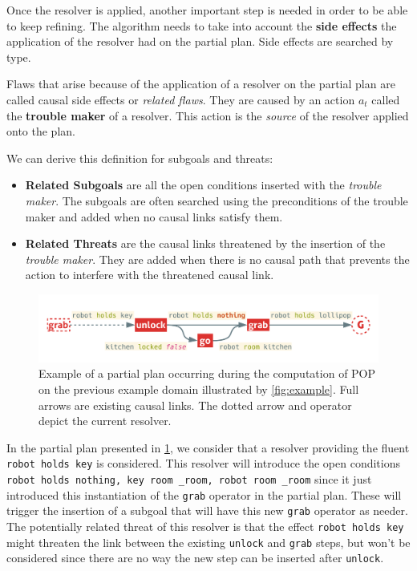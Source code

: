 Once the resolver is applied, another important step is needed in order
to be able to keep refining. The algorithm needs to take into account
the \textbf{side effects} the application of the resolver had on the
partial plan. Side effects are searched by type.

\begin{definition}\label{def:sideeffect}

Flaws that arise because of the application of a resolver on the partial
plan are called causal side effects or \emph{related flaws}. They are
caused by an action \(a_t\) called the \textbf{trouble maker} of a
resolver. This action is the \emph{source} of the resolver applied onto
the plan.

\end{definition}

We can derive this definition for subgoals and threats:

\begin{itemize}
\tightlist
\item
  \textbf{Related Subgoals} are all the open conditions inserted with
  the \emph{trouble maker}. The subgoals are often searched using the
  preconditions of the trouble maker and added when no causal links
  satisfy them.
\item
  \textbf{Related Threats} are the causal links threatened by the
  insertion of the \emph{trouble maker}. They are added when there is no
  causal path that prevents the action to interfere with the threatened
  causal link.
\end{itemize}

\begin{figure}[htbp]
\centering
\includegraphics{graphics/partialplan1.pdf}
\caption{\label{fig:partialplan1}Example of a partial plan occurring
during the computation of POP on the previous example domain illustrated
by \cref{fig:example}. Full arrows are existing causal links. The dotted
arrow and operator depict the current resolver.}
\end{figure}

In the partial plan presented in \cref{fig:partialplan1}, we consider
that a resolver providing the fluent \lstinline!robot holds key! is
considered. This resolver will introduce the open conditions
\lstinline!robot holds nothing, key room _room, robot room _room! since
it just introduced this instantiation of the \lstinline!grab! operator
in the partial plan. These will trigger the insertion of a subgoal that
will have this new \lstinline!grab! operator as needer. The potentially
related threat of this resolver is that the effect
\lstinline!robot holds key! might threaten the link between the existing
\lstinline!unlock! and \lstinline!grab! steps, but won't be considered
since there are no way the new step can be inserted after
\lstinline!unlock!.

